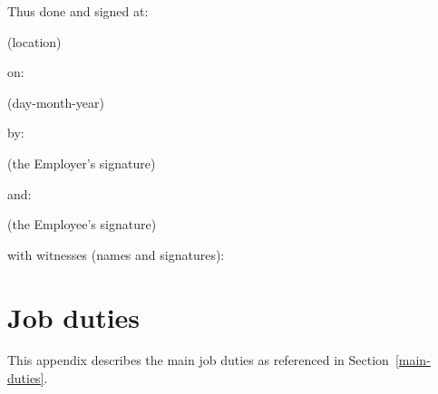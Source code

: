 \documentclass[a4paper,11pt]{article}
\begin{document}
\begin{center}
  Thus done and signed at:

  \vspace{0.5cm}


  (location)

  \vspace{1cm}

  on:

  \vspace{0.5cm}


  (day-month-year)

  \vspace{1cm}

  by:

  \vspace{0.5cm}


  (the Employer's signature)

  \vspace{1cm}

  and:

  \vspace{0.5cm}


  (the Employee's signature)

  \vspace{1cm}

  with witnesses (names and signatures):

  \vspace{0.5cm}


  \vspace{0.5cm}


\end{center}

\pagebreak

\appendix

\section{Job duties}
\label{job-duties}

This appendix describes the main job duties as referenced in
Section~\ref{main-duties}.
\end{document}
